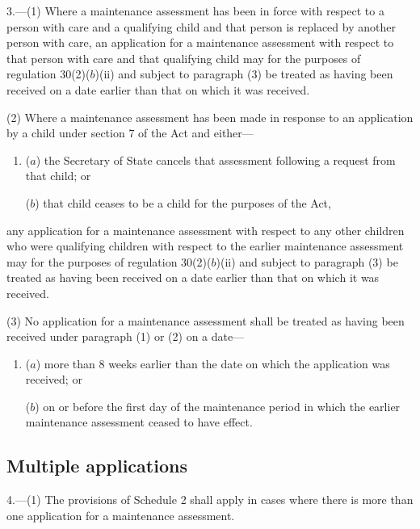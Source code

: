\documentclass[a4paper,12pt]{article}
\begin{document}
3.—(1) Where a maintenance assessment has been in force with respect to a person with care and a qualifying child and that person is replaced by another person with care, an application for a maintenance assessment with respect to that person with care and that qualifying child may for the purposes of regulation 30(2)($b$)(ii) and subject to paragraph (3) be treated as having been received on a date earlier than that on which it was received.

(2) Where a maintenance assessment has been made in response to an application by a child under section 7 of the Act and either—
\begin{enumerate}\item[]
($a$) 
the Secretary of State  %
cancels that assessment following a request from that child; or

($b$) that child ceases to be a child for the purposes of the Act,
\end{enumerate}
any application for a maintenance assessment with respect to any other children who were qualifying children with respect to the earlier maintenance assessment may for the purposes of regulation 30(2)($b$)(ii) and subject to paragraph (3) be treated as having been received on a date earlier than that on which it was received.

(3) No application for a maintenance assessment shall be treated as having been received under paragraph (1) or (2) on a date—
\begin{enumerate}\item[]
($a$) more than 8 weeks earlier than the date on which the application was received; or

($b$) on or before the first day of the maintenance period in which the earlier maintenance assessment ceased to have effect.
\end{enumerate}


\subsection[4. Multiple applications]{Multiple applications}

4.—(1) The provisions of Schedule 2 shall apply in cases where there is more than one application for a maintenance assessment.
\end{document}

